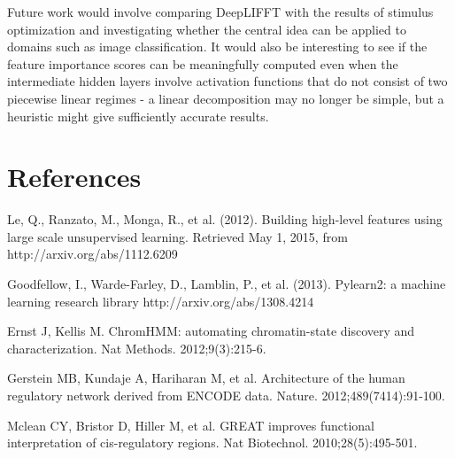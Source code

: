 \documentclass{article}
\begin{document}
Future work would involve comparing DeepLIFFT with the results of stimulus optimization and investigating whether the central idea can be applied to domains such as image classification. It would also be interesting to see if the feature importance scores can be meaningfully computed even when the intermediate hidden layers involve activation functions that do not consist of two piecewise linear regimes - a linear decomposition may no longer be simple, but a heuristic might give sufficiently accurate results.

\section{References}



Le, Q., Ranzato, M., Monga, R., et al. (2012). Building high-level features using large scale unsupervised learning. Retrieved May 1, 2015, from http://arxiv.org/abs/1112.6209

Goodfellow, I., Warde-Farley, D., Lamblin, P., et al. (2013). Pylearn2: a machine learning research library http://arxiv.org/abs/1308.4214

Ernst J, Kellis M. ChromHMM: automating chromatin-state discovery and characterization. Nat Methods. 2012;9(3):215-6.

Gerstein MB, Kundaje A, Hariharan M, et al. Architecture of the human regulatory network derived from ENCODE data. Nature. 2012;489(7414):91-100.

Mclean CY, Bristor D, Hiller M, et al. GREAT improves functional interpretation of cis-regulatory regions. Nat Biotechnol. 2010;28(5):495-501.
\end{document}
